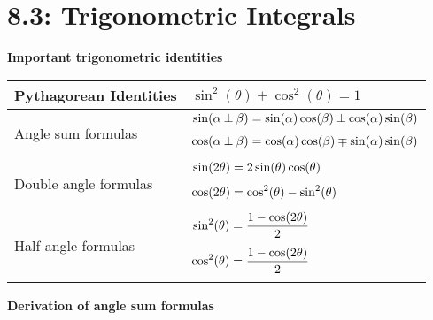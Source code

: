 \documentclass[../mathNotesPreamble]{subfiles}
\begin{document}
  \section{8.3: Trigonometric Integrals}
  \textbf{Important trigonometric identities}
  \begin{center}
    \begin{tabularx}{0.9\linewidth}{@{}
      >{\hsize=0.9\hsize}X
      >{\hsize=1.1\hsize}X
      @{}}\toprule
      Pythagorean Identities&
      \vspace*{0.25\baselineskip}
      $\sin^2(\theta)+\cos^2(\theta)=1$\\[4\baselineskip]\midrule
      Angle sum formulas& 
      \vspace*{0.25\baselineskip}
      $\begin{aligned}
        \sin(\alpha\pm\beta)&=\sin(\alpha)\cos(\beta)\pm\cos(\alpha)\sin(\beta)\\[0.25\baselineskip]
        \cos(\alpha\pm\beta)&=\cos(\alpha)\cos(\beta)\mp\sin(\alpha)\sin(\beta)\\[0.25\baselineskip]
      \end{aligned}$\\\midrule
      Double angle formulas&
      \vspace*{0.25\baselineskip}
      $\begin{aligned}
        \sin(2\theta)&=2\sin(\theta)\cos(\theta)\\[0.25\baselineskip]
        \cos(2\theta)&=\cos^2(\theta)-\sin^2(\theta)\\[0.25\baselineskip]
      \end{aligned}$\\\midrule
      Half angle formulas&
      \vspace*{0.25\baselineskip}
      $\begin{aligned}
        \sin^2(\theta)&=\dfrac{1-\cos(2\theta)}{2}\\[0.25\baselineskip]
        \cos^2(\theta)&=\dfrac{1-\cos(2\theta)}{2}\\[0.25\baselineskip]
      \end{aligned}$\\\bottomrule
    \end{tabularx}
  \end{center}
  \pagebreak

  \textbf{Derivation of angle sum formulas}
\end{document}
